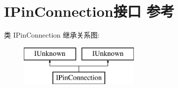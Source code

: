 \hypertarget{interface_i_pin_connection}{}\section{I\+Pin\+Connection接口 参考}
\label{interface_i_pin_connection}
类 I\+Pin\+Connection 继承关系图\+:\begin{figure}[H]
\begin{center}
\leavevmode
\includegraphics[height=2.000000cm]{interface_i_pin_connection}
\end{center}
\end{figure}
